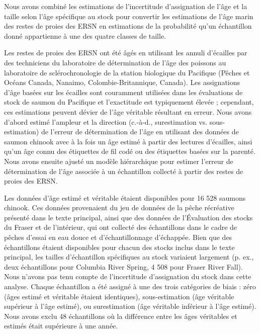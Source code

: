 \label{app:size-at-age}

Nous avons combiné les estimations de l'incertitude d'assignation de l'âge et la taille selon l'âge spécifique au stock pour convertir les estimations de l'âge marin des restes de proies des ERSN en estimations de la probabilité qu'un échantillon donné appartienne à une des quatre classes de taille.


Les restes de proies des ERSN ont été âgés en utilisant les annuli d'écailles par des techniciens du laboratoire de détermination de l'âge des poissons au laboratoire de sclérochronologie de la station biologique du Pacifique (Pêches et Océans Canada, Nanaimo, Colombie-Britannique, Canada). Les assignations d'âge basées sur les écailles sont couramment utilisées dans les évaluations de stock de saumon du Pacifique et l'exactitude est typiquement élevée \citep{mcnicolAccuracyUsingScales2010}; cependant, ces estimations peuvent dévier de l'âge véritable résultant en erreur. Nous avons d'abord estimé l'ampleur et la direction (c.-à-d., surestimation vs. sous-estimation) de l'erreur de détermination de l'âge en utilisant des données de saumon chinook avec à la fois un âge estimé à partir des lectures d'écailles, ainsi qu'un âge connu des étiquettes de fil codé ou des étiquettes basées sur la parenté. Nous avons ensuite ajusté un modèle hiérarchique pour estimer l'erreur de détermination de l'âge associée à un échantillon collecté à partir des restes de proies des ERSN.

Les données d'âge estimé et véritable étaient disponibles pour 16 528 saumons chinook. Ces données provenaient du jeu de données de la pêche récréative présenté dans le texte principal, ainsi que des données de l'Évaluation des stocks du Fraser et de l'intérieur, qui ont collecté des échantillons dans le cadre de pêches d'essai en eau douce et d'échantillonnage d'échappée. Bien que des échantillons étaient disponibles pour chacun des stocks inclus dans le texte principal, les tailles d'échantillon spécifiques au stock variaient largement (p. ex., deux échantillons pour Columbia River Spring, 4 508 pour Fraser River Fall). Nous n'avons pas tenu compte de l'incertitude d'assignation du stock dans cette analyse. Chaque échantillon a été assigné à une des trois catégories de biais : zéro (âges estimé et véritable étaient identiques), sous-estimation (âge véritable supérieur à l'âge estimé), ou surestimation (âge véritable inférieur à l'âge estimé). Nous avons exclu 48 échantillons où la différence entre les âges véritables et estimés était supérieure à une année. 

